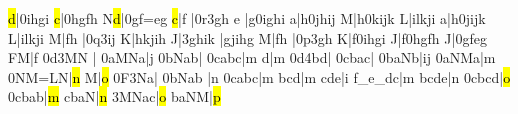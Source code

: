 \barre\notes{}\hl d|\qqh0ihgi\enotes
\temps\notes{}\hl c|\qqh0hgfh\enotes
\alaligne\notes{}\lh N\hl d|\qqh0gf{=e}g\enotes
\temps\notes{}\hl c|\qu f\sk\enotes
\temps\notes{}|\Ilegu0r\dqh3gh\enotes
\barre\notes\bohl e\relax
     |\zq g\qqh0ighi\enotes
\temps\notes\bohl a|\zq h\qqh0jhij\enotes
\barre\notes\bohu M|\zq h\qqh0kijk\enotes
\temps\notes\bohu L|\zq ilkji\enotes
\barre\notes\bohu a|\zq h\qqh0jijk\enotes
\temps\notes\bohu L|\zq ilkji\enotes
\alaligne\Notes\bohu M|\zq f\qu h\enotes
\temps\notes|\Ilegu0q\dqh3ij\enotes
\temps\notes\bohu K|\zq hkjih\enotes
\barre\notes\bohu J|\qqh3ghik\enotes
\temps\notes{}|\zq gjihg\enotes
\barre\Notes\bohu M|\zq f\qu h\enotes
\temps\notes|\Ilegu0p\dqh3gh\enotes
\temps\notes\bohu K|\zq f\qqh0ihgi\enotes
\barre\notes\bohu J|\zq f\qqh0hgfh\enotes
\temps\notes\bohu J|\qqh0gfeg\enotes
\xbarre\Notes\zq F\ql M|\qu f\enotes
\zalapage\notes{}\Ilegu0d\dqb3MN\relax
    |\soupir{}\enotes
\temps\notes\qqB0aMNa|\hu j\enotes
\barre\notes\qqB0bNab|\enotes
\temps\notes\qqB0cabc|\hu m\enotes
\barre\notes{}\ql d\sk|\hu m\enotes
\temps\notes\Ilegu0d\dqb4bd|\enotes
\temps\notes\qqB0cbac|\enotes
\barre\notes\qqB0baNb|\zh i\rh j\enotes
\temps\notes\qqB0aNMa|\hu m\enotes
\alaligne\notes\qqB0NM{=L}N|\hl n\enotes
\temps\notes{}\ql M\sk|\hl o\enotes
\temps\notes\Ilegl0F\dqb3Na|\enotes
\barre\notes{}\qqB0bNab\relax
     |\hu n\enotes
\temps\notes\qqB0cabc|\hu m\enotes
\barre\notes{}bcd|\hu m\enotes
\temps\notes{}cde|\rh i\enotes
\barre\notes{}f{_e}{_d}c|\hu m\enotes
\temps\notes{}bcde|\hu n\enotes
\alaligne\notes\qqb0cbcd|\hl o\enotes
\temps\notes\qqb0cbab|\hl m\enotes
\barre\notes{}cbaN|\hl n\enotes
\temps\notes\qqb3MNac|\hl o\enotes
\barre\notes{}baNM|\hl p\enotes
